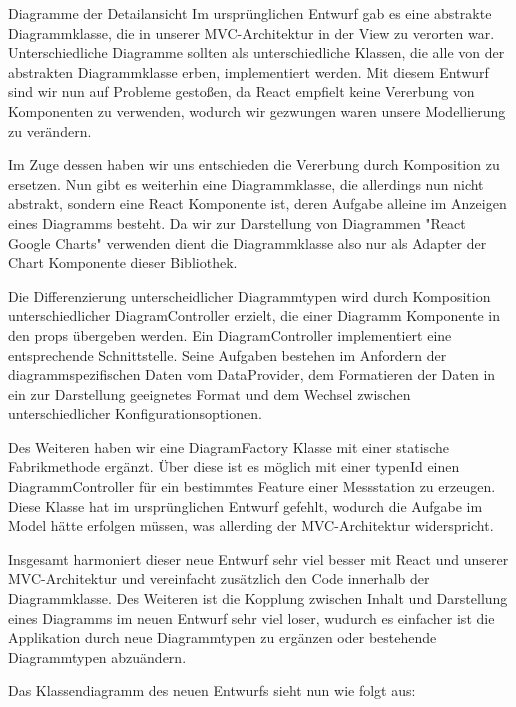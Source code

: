 \begin{Change}{Diagramme der Detailansicht}
    Im ursprünglichen Entwurf gab es eine abstrakte Diagrammklasse, die in unserer MVC-Architektur in der View zu verorten war. Unterschiedliche Diagramme sollten als unterschiedliche Klassen, die alle von der abstrakten Diagrammklasse erben, implementiert werden.
    Mit diesem Entwurf sind wir nun auf Probleme gestoßen, da React empfielt keine Vererbung von Komponenten zu verwenden, wodurch wir gezwungen waren unsere Modellierung zu verändern.

    Im Zuge dessen haben wir uns entschieden die Vererbung durch Komposition zu ersetzen. Nun gibt es weiterhin eine Diagrammklasse, die allerdings nun nicht abstrakt, sondern eine React Komponente ist, deren Aufgabe alleine im Anzeigen eines Diagramms besteht. Da wir zur Darstellung von Diagrammen "React Google Charts" verwenden dient die Diagrammklasse also nur als Adapter der Chart Komponente dieser Bibliothek.

    Die Differenzierung unterscheidlicher Diagrammtypen wird durch Komposition unterschiedlicher DiagramController erzielt, die einer Diagramm Komponente in den props übergeben werden. Ein DiagramController implementiert eine entsprechende Schnittstelle. Seine Aufgaben bestehen im Anfordern der diagrammspezifischen Daten vom DataProvider, dem Formatieren der Daten in ein zur Darstellung geeignetes Format und dem Wechsel zwischen unterschiedlicher Konfigurationsoptionen.

    Des Weiteren haben wir eine DiagramFactory Klasse mit einer statische Fabrikmethode ergänzt. Über diese ist es möglich mit einer typenId einen DiagrammController für ein bestimmtes Feature einer Messstation zu erzeugen. Diese Klasse hat im ursprünglichen Entwurf gefehlt, wodurch die Aufgabe im Model hätte erfolgen müssen, was allerding der MVC-Architektur widerspricht.

    Insgesamt harmoniert dieser neue Entwurf sehr viel besser mit React und unserer MVC-Architektur und vereinfacht zusätzlich den Code innerhalb der Diagrammklasse. Des Weiteren ist die Kopplung zwischen Inhalt und Darstellung eines Diagramms im neuen Entwurf sehr viel loser, wudurch es einfacher ist die Applikation durch neue Diagrammtypen zu ergänzen oder bestehende Diagrammtypen abzuändern.
    
    Das Klassendiagramm des neuen Entwurfs sieht nun wie folgt aus:
\end{Change}